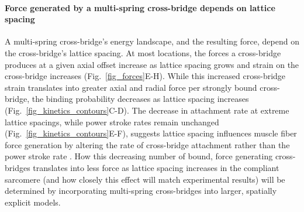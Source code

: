 \documentclass[]{article}
\begin{document}
\paragraph{Force generated by a multi-spring cross-bridge depends on lattice spacing} %
A multi-spring cross-bridge's energy landscape, and the resulting force, depend on the cross-bridge's lattice spacing.
At most locations, the forces a cross-bridge produces at a given axial offset increase as lattice spacing grows and strain on the cross-bridge increases (Fig.~\ref{fig_forces}E-H). 
While this increased cross-bridge strain translates into greater axial and radial force per strongly bound cross-bridge, the binding probability decreases as lattice spacing increases (Fig.~\ref{fig_kinetics_contours}C-D).
The decrease in attachment rate at extreme lattice spacings, while power stroke rates remain unchanged (Fig.~\ref{fig_kinetics_contours}E-F), suggests lattice spacing influences muscle fiber force generation by altering the rate of cross-bridge attachment rather than the power stroke rate \citep{Martyn2004}. 
How this decreasing number of bound, force generating cross-bridges translates into less force as lattice spacing increases in the compliant sarcomere (and how closely this effect will match experimental results) will be determined by incorporating multi-spring cross-bridges into larger, spatially explicit models. 
\end{document}
